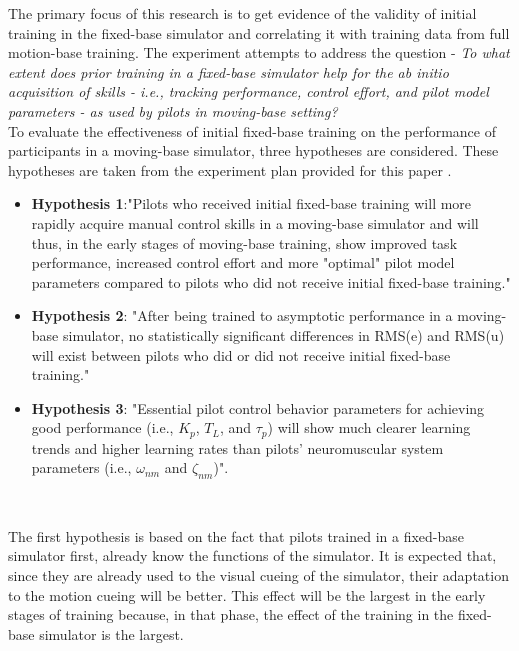 \documentclass[conference]{IEEEtran}
\begin{document}
The primary focus of this research is to get evidence of the validity of initial training in the fixed-base simulator and correlating it with training data from full motion-base training. The experiment attempts to address the question - \textit{To what extent does prior training in a fixed-base simulator help for the ab initio acquisition
of skills - i.e., tracking performance, control effort, and pilot model parameters - as used by pilots in moving-base setting?}\\



To evaluate the effectiveness of initial fixed-base training on the performance of participants in a moving-base simulator, three hypotheses are considered. These hypotheses are taken from the experiment plan provided for this paper \cite{experimentplan}.


\begin{itemize}
    \item \textbf{Hypothesis 1}:"Pilots who received initial fixed-base training will more rapidly acquire manual control skills in a moving-base simulator and will thus, in the early stages of moving-base training, show improved task performance, increased control effort and more "optimal" pilot model parameters compared to pilots who did not receive initial fixed-base training." \cite{experimentplan}
    \item \textbf{Hypothesis 2}: "After being trained to asymptotic performance in a moving-base simulator, no statistically significant differences in RMS(e) and RMS(u) will exist between pilots who did or did not receive initial fixed-base training." \cite{experimentplan} \label{hypothesis 2}
    \item \textbf{Hypothesis 3}: "Essential pilot control behavior parameters for achieving good performance (i.e., $K_p$, $T_L$, and $\tau_p$) will show much clearer learning trends and higher learning rates than pilots' neuromuscular system parameters (i.e., $\omega_{nm}$ and $\zeta_{nm}$)". \cite{experimentplan} 
\end{itemize}\\
\vspace{2mm}

The first hypothesis is based on the fact that pilots trained in a fixed-base simulator first, already know the functions of the simulator. It is expected that, since they are already used to the visual cueing of the simulator, their adaptation to the motion cueing will be better. This effect will be the largest in the early stages of training because, in that phase, the effect of the training in the fixed-base simulator is the largest. 
\end{document}
